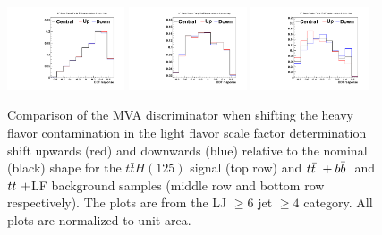 \begin{description}
\begin{figure}[hbtp]
 \begin{center}
   \includegraphics[width=0.31\textwidth]{Figures/Analysis_2_Diagrams/SystPlot_CMS_ttH_CSVHF_ttH125_ljets_jge6_tge4}
   \includegraphics[width=0.31\textwidth]{Figures/Analysis_2_Diagrams/SystPlot_CMS_ttH_CSVHF_ttbarPlusBBbar_ljets_jge6_tge4}
   \includegraphics[width=0.31\textwidth]{Figures/Analysis_2_Diagrams/SystPlot_CMS_ttH_CSVHF_ttbar_ljets_jge6_tge4}
   \caption{ Comparison of the MVA discriminator when shifting the
     heavy flavor contamination in the light flavor scale factor
     determination shift upwards (red) and downwards (blue) relative
     to the nominal (black) shape for the $t\bar{t}H(125)$ signal (top
     row) and $t{\bar{t}}~+b{\bar{b}}~$ and $t{\bar{t}}~+$LF background samples
     (middle row and bottom row respectively).  The plots are from the
     LJ $\geq 6$ jet $\geq 4$ category.  All plots are normalized to unit area.}
   \label{fig:CSVHF}
 \end{center}
\end{figure}


\end{description}
